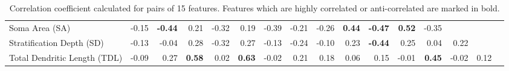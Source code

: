 \documentclass[11pt]{article}
\begin{document}
\begin{sidewaystable}
\begin{tabular}{lrrrrrrrrrrrrrrr}
Soma Area (SA) & -0.15 & \textbf{-0.44} & 0.21 & -0.32 & 0.19 & -0.39 & -0.21 & -0.26 & \textbf{0.44} & \textbf{-0.47} & \textbf{0.52} & -0.35 & \textbf{}  &  & \\
Stratification Depth (SD) & -0.13 & -0.04 & 0.28 & -0.32 & 0.27 & -0.13 & -0.24 & -0.10 & 0.23 & \textbf{-0.44} & 0.25 & 0.04 & 0.22 & \textbf{}  & \\
Total Dendritic Length (TDL) & -0.09 & 0.27 & \textbf{0.58} & 0.02 & \textbf{0.63} & -0.02 & 0.21 & 0.18 & 0.06 & 0.15 & -0.01 & \textbf{0.45} & -0.02 & 0.12 & \textbf{} \\
\bottomrule
\end{tabular}
\caption{Correlation coefficient calculated for pairs of 15
  features. Features which are highly correlated or anti-correlated
  are marked in bold.}
\label{tab:corr}\end{sidewaystable}







\clearpage


% 
\end{document}
